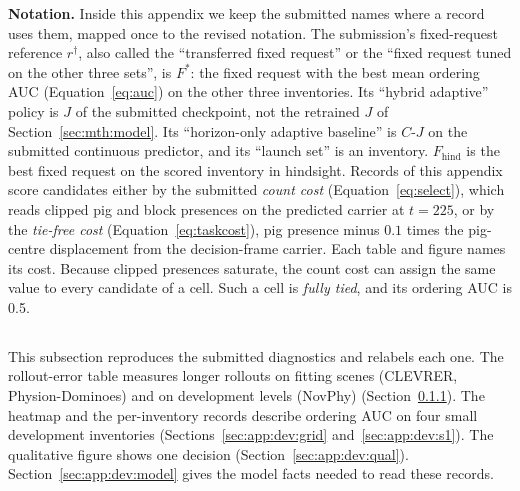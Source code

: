 \begin{revblock}
\textbf{Notation.} Inside this appendix we keep the submitted names where a record uses them, mapped once to the revised notation. The submission's fixed-request reference $r^\dagger$, also called the ``transferred fixed request'' or the ``fixed request tuned on the other three sets'', is $F^{*}$: the fixed request with the best mean ordering AUC (Equation~\ref{eq:auc}) on the other three inventories. Its ``hybrid adaptive'' policy is $J$ of the submitted checkpoint, not the retrained $J$ of Section~\ref{sec:mth:model}. Its ``horizon-only adaptive baseline'' is $C\text{-}J$ on the submitted continuous predictor, and its ``launch set'' is an inventory. $F_{\mathrm{hind}}$ is the best fixed request on the scored inventory in hindsight. Records of this appendix score candidates either by the submitted \emph{count cost} (Equation~\ref{eq:select}), which reads clipped pig and block presences on the predicted carrier at $t=225$, or by the \emph{tie-free cost} (Equation~\ref{eq:taskcost}), pig presence minus $0.1$ times the pig-centre displacement from the decision-frame carrier. Each table and figure names its cost. Because clipped presences saturate, the count cost can assign the same value to every candidate of a cell. Such a cell is \emph{fully tied}, and its ordering AUC is 0.5.
\end{revblock}

\subsection{\texorpdfstring{}{Development and In-Sample Diagnostics of the Submitted Checkpoint}}
\label{sec:app:dev:insample}

\begin{revblock}
This subsection reproduces the submitted diagnostics and relabels each one. The rollout-error table measures longer rollouts on fitting scenes (CLEVRER, Physion-Dominoes) and on development levels (NovPhy) (Section~\ref{sec:app:dev:rollout}). The heatmap and the per-inventory records describe ordering AUC on four small development inventories (Sections~\ref{sec:app:dev:grid} and~\ref{sec:app:dev:s1}). The qualitative figure shows one decision (Section~\ref{sec:app:dev:qual}). Section~\ref{sec:app:dev:model} gives the model facts needed to read these records.
\end{revblock}

\subsubsection{\texorpdfstring{}{Rollout Error on Annotation Carriers}}
\label{sec:app:dev:rollout}

